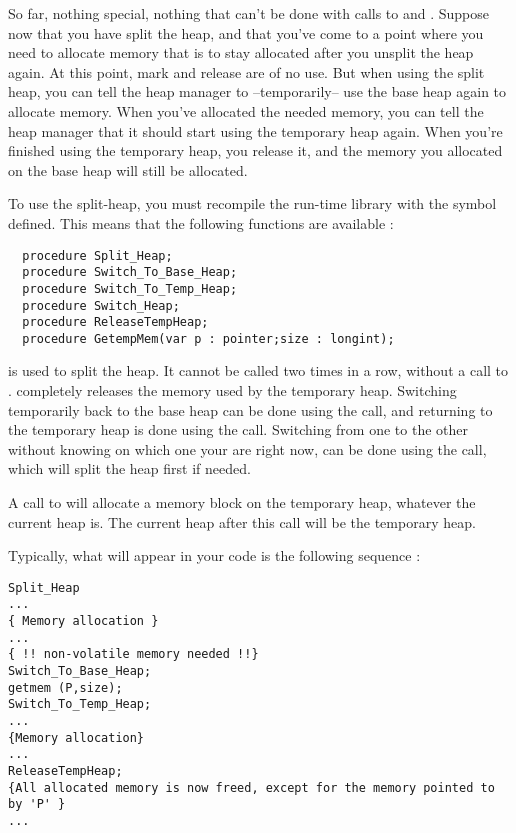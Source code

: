 \documentclass{report}
\begin{document}
So far, nothing special, nothing that can't be done with calls to 
and . Suppose now that you have split the heap, and that you've
come to a point where you need to allocate memory that is to stay allocated
after you unsplit the heap again. At this point, mark and release are of no
use. But when using the split heap, you can tell the heap manager to
--temporarily-- use the base heap again to allocate memory.
When you've allocated the needed memory, you can tell the heap manager that
it should start using the temporary heap again.
When you're finished using the temporary heap, you release it, and the
memory you allocated on the base heap will still be allocated.

To use the split-heap, you must recompile the run-time library with the 
symbol defined.
This means that the following functions are available :
\begin{verbatim}
  procedure Split_Heap;
  procedure Switch_To_Base_Heap;
  procedure Switch_To_Temp_Heap;
  procedure Switch_Heap;
  procedure ReleaseTempHeap;
  procedure GetempMem(var p : pointer;size : longint);
\end{verbatim}
 is used to split the heap. It cannot be called two times
in a row, without a call to . 
completely releases the memory used by the temporary heap.
Switching temporarily back to the base heap can be done using the
 call, and returning to the temporary heap is done
using the  call. Switching from one to the other
without knowing on which one your are right now, can be done using the
 call, which will split the heap first if needed.

A call to  will allocate a memory block on the temporary
heap, whatever the current heap is. The current heap after this call will be
the temporary heap.

Typically, what will appear in your code is the following sequence :
\begin{verbatim}
Split_Heap
...
{ Memory allocation }
...
{ !! non-volatile memory needed !!}
Switch_To_Base_Heap;
getmem (P,size);
Switch_To_Temp_Heap;
...
{Memory allocation}
...
ReleaseTempHeap;
{All allocated memory is now freed, except for the memory pointed to by 'P' }
...
\end{verbatim}

\end{document}
